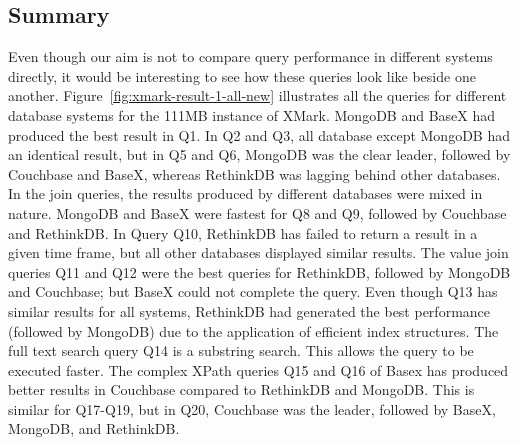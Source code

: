 \subsection{Summary}
Even though our aim is not to compare query performance in different systems directly, it would be interesting to see how these queries look like beside one another. Figure~\ref{fig:xmark-result-1-all-new} illustrates all the queries for different database systems for the 111MB instance of XMark. MongoDB and BaseX had produced the best result in Q1. In Q2 and Q3, all database except MongoDB had an identical result, but in Q5 and Q6, MongoDB was the clear leader, followed by Couchbase and BaseX, whereas RethinkDB was lagging behind other databases. In the join queries, the results produced by different databases were mixed in nature. MongoDB and BaseX were fastest for Q8 and Q9, followed by Couchbase and RethinkDB. In Query Q10, RethinkDB has failed to return a result in a given time frame, but all other databases displayed similar results. The value join queries Q11 and Q12 were the best queries for RethinkDB, followed by MongoDB and Couchbase; but BaseX could not complete the query. Even though Q13 has similar results for all systems, RethinkDB had generated the best performance (followed by MongoDB) due to the application of efficient index structures. The full text search query Q14 is a substring search. This allows the query to be executed faster. The complex XPath queries Q15 and Q16 of Basex has produced better results in Couchbase compared to RethinkDB and MongoDB. This is similar for Q17-Q19, but in Q20, Couchbase was the leader, followed by BaseX, MongoDB, and RethinkDB. 

